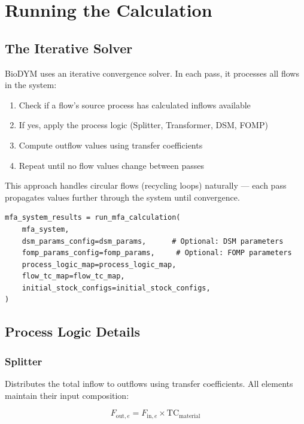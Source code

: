 \chapter{Running the Calculation}
\label{ch:calculation}

\section{The Iterative Solver}

BioDYM uses an iterative convergence solver. In each pass, it processes all flows in the system:

\begin{enumerate}
  \item Check if a flow's source process has calculated inflows available
  \item If yes, apply the process logic (Splitter, Transformer, DSM, FOMP)
  \item Compute outflow values using transfer coefficients
  \item Repeat until no flow values change between passes
\end{enumerate}

This approach handles circular flows (recycling loops) naturally --- each pass propagates values further through the system until convergence.

\begin{lstlisting}[style=python]
mfa_system_results = run_mfa_calculation(
    mfa_system,
    dsm_params_config=dsm_params,      # Optional: DSM parameters
    fomp_params_config=fomp_params,     # Optional: FOMP parameters
    process_logic_map=process_logic_map,
    flow_tc_map=flow_tc_map,
    initial_stock_configs=initial_stock_configs,
)
\end{lstlisting}

\section{Process Logic Details}

\subsection{Splitter}

Distributes the total inflow to outflows using transfer coefficients. All elements maintain their input composition:

\begin{equation}
  F_{\text{out},e} = F_{\text{in},e} \times \text{TC}_{\text{material}}
\end{equation}

